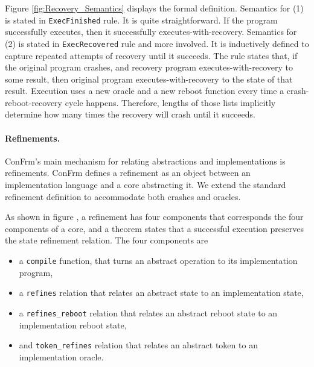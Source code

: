 Figure \ref{fig:Recovery_Semantics} displays the formal definition.
Semantics for (1) is stated in \texttt{ExecFinished} rule. It is quite straightforward. If the program successfully executes, then it successfully executes-with-recovery.
Semantics for (2) is stated in \texttt{ExecRecovered} rule and more involved. It is inductively defined to capture repeated attempts of recovery until it succeeds. The rule states that, if the original program crashes, and recovery program executes-with-recovery to some result, then original program executes-with-recovery to the state of that result. Execution uses a new oracle and a new reboot function every time a crash-reboot-recovery cycle happens. Therefore, lengths of those lists implicitly determine how many times the recovery will crash until it succeeds.

\paragraph{Refinements.}
ConFrm's main mechanism for relating abstractions and implementations is refinements. 
ConFrm defines a refinement as an object between an implementation language and a core abstracting it. We extend the standard refinement definition to accommodate both crashes and oracles.

As shown in figure \label{fig:Core_Refinement_Definition}, a refinement has four components that corresponds the four components of a core, and a theorem states that a successful execution preserves the state refinement relation. The four components are
\begin{itemize}
    \item a \texttt{compile} function, that turns an  abstract operation to its implementation program,
    \item a \texttt{refines} relation that relates an abstract state to an implementation state,
    \item a \texttt{refines\_reboot} relation that relates an abstract reboot state to an implementation reboot state,
    \item and  \texttt{token\_refines} relation that relates an abstract token to an implementation oracle.
\end{itemize}

